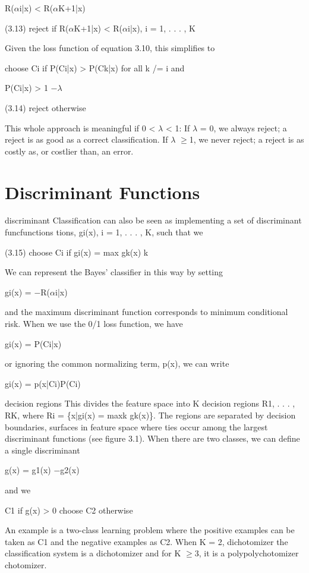 R($\alpha$i|x) < R($\alpha$K+1|x)

(3.13) reject if R($\alpha$K+1|x) < R($\alpha$i|x), i = 1, . . . , K

Given the loss function of equation 3.10, this simplifies to

choose Ci if P(Ci|x) > P(Ck|x) for all k /= i and

P(Ci|x) > 1 $-$$\lambda$

(3.14) reject otherwise

This whole approach is meaningful if 0 < $\lambda$ < 1: If $\lambda$ = 0, we always reject; a reject is as good as a correct classification. If $\lambda$ $\geq$1, we never reject; a reject is as costly as, or costlier than, an error.

\section{Discriminant Functions}

discriminant Classification can also be seen as implementing a set of discriminant funcfunctions tions, gi(x), i = 1, . . . , K, such that we

(3.15) choose Ci if gi(x) = max gk(x) k

We can represent the Bayes’ classifier in this way by setting

gi(x) = $-$R($\alpha$i|x)

and the maximum discriminant function corresponds to minimum conditional risk. When we use the 0/1 loss function, we have

gi(x) = P(Ci|x)

or ignoring the common normalizing term, p(x), we can write

gi(x) = p(x|Ci)P(Ci)

decision regions This divides the feature space into K decision regions R1, . . . , RK, where Ri = \{x|gi(x) = maxk gk(x)\}. The regions are separated by decision boundaries, surfaces in feature space where ties occur among the largest discriminant functions (see figure 3.1). When there are two classes, we can define a single discriminant

g(x) = g1(x) $-$g2(x)

and we

C1 if g(x) > 0 choose C2 otherwise

An example is a two-class learning problem where the positive examples can be taken as C1 and the negative examples as C2. When K = 2, dichotomizer the classification system is a dichotomizer and for K $\geq$3, it is a polypolychotomizer chotomizer.

